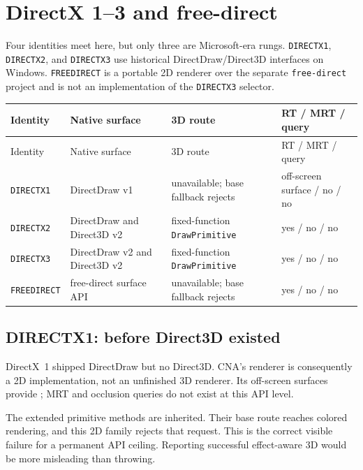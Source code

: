 \chapter{DirectX 1--3 and free-direct}
\label{ch:directx-time-machine}
\label{ch:dx3-freedirect-renderer}
\label{ch:dx3-freedirect-backend}

Four identities meet here, but only three are Microsoft-era rungs.  \texttt{DIRECTX1},
\texttt{DIRECTX2}, and \texttt{DIRECTX3} use historical DirectDraw/Direct3D interfaces on
Windows.  \texttt{FREEDIRECT} is a portable 2D renderer over the separate \texttt{free-direct}
project and is not an implementation of the \texttt{DIRECTX3} selector.

\begin{longtable}{p{}p{}p{}p{}}
\toprule
Identity & Native surface & 3D route & RT / MRT / query \\
\midrule
\endfirsthead
\toprule
Identity & Native surface & 3D route & RT / MRT / query \\
\midrule
\endhead
\texttt{DIRECTX1} & DirectDraw v1 & unavailable; base fallback rejects & off-screen surface / no / no \\
\texttt{DIRECTX2} & DirectDraw and Direct3D v2 & fixed-function \texttt{DrawPrimitive} & yes / no / no \\
\texttt{DIRECTX3} & DirectDraw v2 and Direct3D v2 & fixed-function \texttt{DrawPrimitive} & yes / no / no \\
\texttt{FREEDIRECT} & free-direct surface API & unavailable; base fallback rejects & yes / no / no \\
\bottomrule
\end{longtable}

\section{DIRECTX1: before Direct3D existed}

DirectX~1 shipped DirectDraw but no Direct3D. CNA's renderer is consequently a 2D
implementation, not an unfinished 3D renderer.  Its off-screen surfaces provide
; MRT and occlusion queries do not exist at this API level.

The extended primitive methods are inherited.  Their base route reaches colored rendering,
and this 2D family rejects that request.  This is the correct visible failure for a permanent
API ceiling.  Reporting successful effect-aware 3D would be more misleading than throwing.

